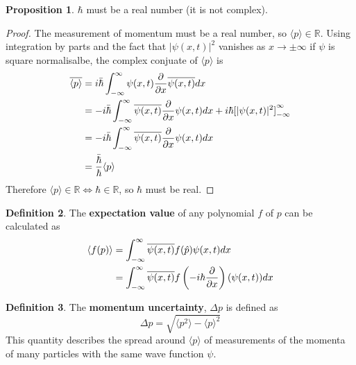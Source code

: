 \documentclass[12pt,a4paper]{article}
\theoremstyle{definition}
\newtheorem{definition}{Definition}[subsection]
\newtheorem{proposition}[definition]{Proposition}
\begin{document}
\begin{proposition}
	$\hbar$ must be a real number (it is not complex).
\end{proposition}

\begin{proof}
	The measurement of momentum must be a real number, so $\langle p \rangle \in \mathbb{R}$. Using integration by parts and the fact that $|\psi(x, t)|^2$ vanishes as $x \rightarrow \pm \infty$ if $\psi$ is square normalisalbe, the complex conjuate of $\langle p \rangle$ is
	\[
		\begin{aligned}
			\overline{\langle p \rangle}
				& = i \bar{\hbar} \int_{-\infty}^{\infty} \psi(x, t) \diffp{}{x} \overline{\psi(x, t)} dx \\
				& = -i \bar{\hbar} \int_{-\infty}^{\infty} \overline{\psi(x, t)} \diffp{}{x} \psi(x, t) dx + i \hbar {[|\psi(x, t)|^2]}_{-\infty}^{\infty} \\
				& = -i \bar{\hbar} \int_{-\infty}^{\infty} \overline{\psi(x, t)} \diffp{}{x} \psi(x, t) dx \\
				& = \frac{\bar{\hbar}}{\hbar} \langle p \rangle
		\end{aligned}
	\]
	Therefore $\langle p \rangle \in \mathbb{R} \Longleftrightarrow \hbar \in \mathbb{R}$, so $\hbar$ must be real.
\end{proof}

\begin{definition}
	The \textbf{expectation value} of any polynomial $f$ of $p$ can be calculated as
	\[
		\begin{aligned}
			\langle f(p) \rangle
				& = \int_{-\infty}^{\infty} \overline{\psi(x, t)} f(\hat{p}) \psi(x, t) dx \\
				& = \int_{-\infty}^{\infty} \overline{\psi(x, t)} f \left( -i \hbar \diffp{}{x} \right ) (\psi(x, t)) dx
		\end{aligned}
	\]
\end{definition}

\begin{definition}
	The \textbf{momentum uncertainty}, $\Delta p$ is defined as
	\[
		\Delta p = \sqrt{\langle p^2 \rangle - {\langle p \rangle}^2}
	\]
	This quantity describes the spread around $\langle p \rangle$ of measurements of the momenta of many particles with the same wave function $\psi$.
\end{definition}
\end{document}
